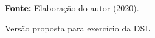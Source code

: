 \begin{figure}[ht!]
\centering

\caption{\textmd{Versão proposta para exercício da DSL}}
\label{fig:exercicio}

\par\medskip\textbf{Fonte:} Elaboração do autor (2020). \par\medskip

\end{figure}

